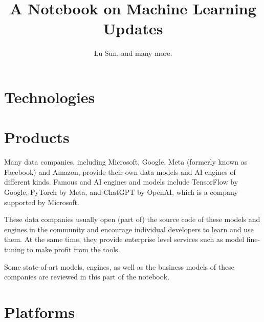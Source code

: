 



\makeindex



\frontmatter

\title{A Notebook on Machine Learning Updates}
\author{Lu Sun, and many more.}

\maketitle


\tableofcontents


\listoffigures
\listoftables

\mainmatter

\part{Technologies}





\part{Products}

Many data companies, including Microsoft, Google, Meta (formerly known as Facebook) and Amazon, provide their own data models and AI engines of different kinds. Famous and AI engines and models include TensorFlow by Google, PyTorch by Meta, and ChatGPT by OpenAI, which is a company supported by Microsoft.

These data companies usually open (part of) the source code of these models and engines in the community and encourage individual developers to learn and use them. At the same time, they provide enterprise level services such as model fine-tuning to make profit from the tools.

Some state-of-art models, engines, as well as the business models of these companies are reviewed in this part of the notebook.







\part{Platforms}






\printindex


